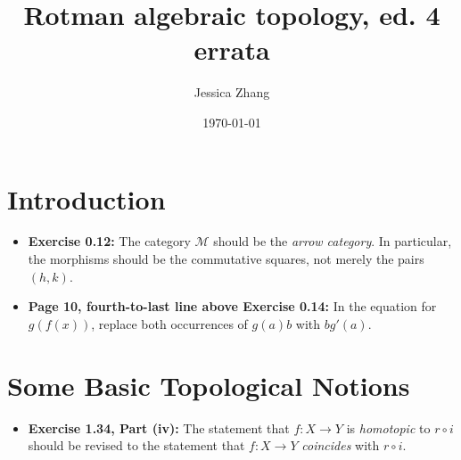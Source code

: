 \documentclass{article}
\title{Rotman algebraic topology, ed. 4 errata}
\author{Jessica Zhang}
\date{\today}
\newcommand*\loc[1]{\textbf{#1:}}
\begin{document}
\maketitle

\section{Introduction} 
\begin{itemize} 
\item \loc{Exercise 0.12} 
The category $\mathcal M$ should be the \emph{arrow category}. In particular, the morphisms should be the commutative squares, not merely the pairs $(h,k)$. 

\item \loc{Page 10, fourth-to-last line above Exercise 0.14} 
In the equation for $g(f(x))$, replace both occurrences of $g(a)b$ with $bg'(a)$. 
\end{itemize} 

\section{Some Basic Topological Notions} 
\begin{itemize}
\item \loc{Exercise 1.34, Part (iv)} 
The statement that $f:X\to Y$ is \emph{homotopic} to $r\circ i$ should be revised to the statement that $f:X\to Y$ \emph{coincides} with $r\circ i$. 
\end{itemize}
\end{document}

